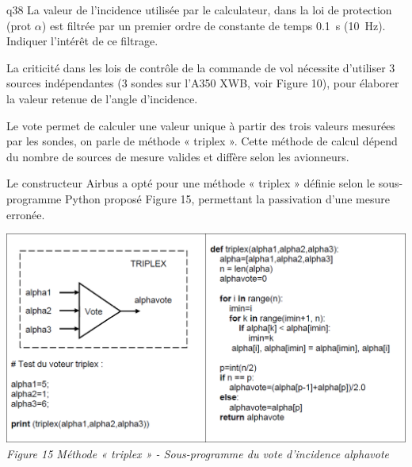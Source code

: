 \begin{multicols}{2}
{\begin{question}{q38}
La valeur de l’incidence utilisée par le calculateur, dans la loi de protection (prot $\alpha$) est filtrée par un premier ordre de constante de temps \SI{0,1}{s} (\SI{10}{Hz}). Indiquer l’intérêt de ce filtrage.
\ifprof
\begin{corrige}
\end{corrige}
\else
\fi
\begin{reponses}
\end{reponses} \end{question}}  


La criticité dans les lois de contrôle de la commande de vol nécessite d'utiliser 3 sources indépendantes
(3 sondes sur l’A350 XWB, voir Figure 10), pour élaborer la valeur retenue de l’angle d’incidence.

Le vote permet de calculer une valeur unique à partir des trois valeurs mesurées par les sondes, on parle
de méthode « triplex ».
Cette méthode de calcul dépend du nombre de sources de mesure valides et diffère selon les avionneurs.

Le constructeur Airbus a opté pour une méthode « triplex » définie selon le sous-programme Python proposé Figure 15, permettant la passivation d’une mesure erronée.

\begin{center}
\includegraphics[width=\linewidth]{images/fig_18_bis}
\textit{Figure 15 Méthode « triplex » - Sous-programme du vote d'incidence alphavote}
\end{center}




\end{multicols}
